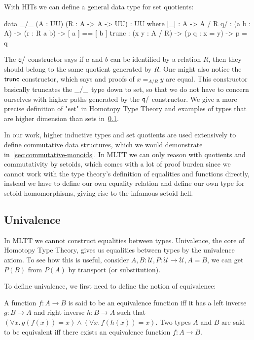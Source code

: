 With HITs we can define a general data type for set quotients:
\begin{code}
data _/_ (A : UU) (R : A -> A -> UU) : UU where
    [_]  : A -> A / R
    q/ : (a b : A) -> (r : R a b) -> [ a ] == [ b ]
    trunc : (x y : A / R) -> (p q : x = y) -> p = q
\end{code}

The $\operatorname{\mathsf{q/}}$ constructor says if $a$ and $b$ can be identified by a relation $R$, then
they should belong to the same quotient generated by $R$.
One might also notice the $\operatorname{\mathsf{trunc}}$ constructor, which says and proofs of $x =_{A/R} y$ are equal.
This constructor basically truncates the $\operatorname{\mathsf{\_/\_}}$ type down to set, so that we do not have to
concern ourselves with higher paths generated by the $\operatorname{\mathsf{q/}}$ constructor.
We give a more precise definition of "set" in Homotopy Type Theory and examples of types that are
higher dimension than sets in~\cref{types:univalence}.

In our work, higher inductive types and set quotients are used extensively to define commutative
data structures, which we would demonstrate in~\cref{sec:commutative-monoids}. In MLTT we can only
reason with quotients and commutativity by setoids, which comes with a lot of proof burden
since we cannot work with the type theory's definition of equalities and functions directly,
instead we have to define our own equality relation and define our own type for setoid homomorphisms,
giving rise to the infamous setoid hell.

\subsection{Univalence}\label{types:univalence}
In MLTT we cannot construct equalities between types. Univalence, the core of Homotopy Type Theory,
gives us equalities between types by the univalence axiom. To see how this is useful,
consider $A, B : \mathcal{U}, P : \mathcal{U} \rightarrow \mathcal{U}, A = B$, we can
get $P(B)$ from $P(A)$ by transport (or substitution).  

To define univalence, we first need to define the notion of equivalence:
\begin{definition}[Equivalence]
    A function $f : A \to B$ is said to be an equivalence
    function iff it has a left inverse $g : B \to A$ and right inverse 
    $h : B \to A$ such that
    $(\forall x.\, g(f(x)) = x) \land (\forall x.\, f(h(x)) = x)$. 
    Two types $A$ and $B$ are said to be equivalent iff there exists
    an equivalence function $f : A \to B$. 
\end{definition}

